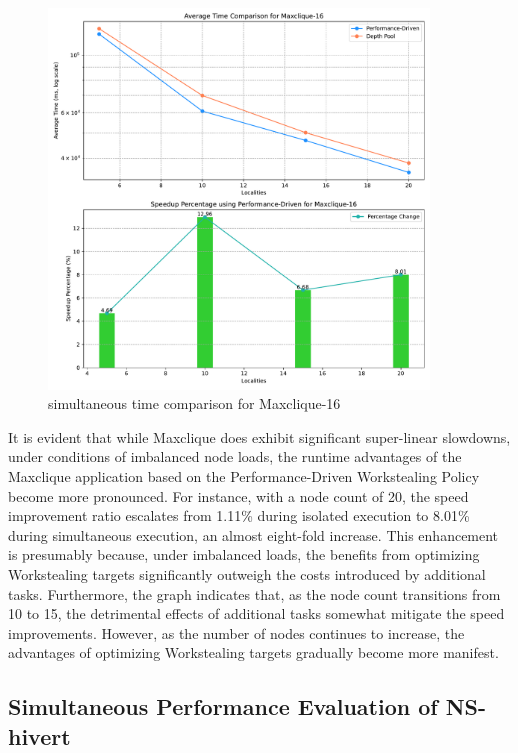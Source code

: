 \documentclass{mproj}
\begin{document}
\begin{figure}[h]
    \centering
    \includegraphics[width=0.9\textwidth]{images/time_comparison_max_simultaneously.pdf}
    \caption{simultaneous time comparison for Maxclique-16}
    \label{fig:time_comparison_max_simu}
\end{figure}
\FloatBarrier

It is evident that while Maxclique does exhibit significant super-linear slowdowns, under conditions of imbalanced node loads, the runtime advantages of the Maxclique application based on the Performance-Driven Workstealing Policy become more pronounced.
For instance, with a node count of 20, the speed improvement ratio escalates from 1.11\% during isolated execution to 8.01\% during simultaneous execution, an almost eight-fold increase.
This enhancement is presumably because, under imbalanced loads, the benefits from optimizing Workstealing targets significantly outweigh the costs introduced by additional tasks.
Furthermore, the graph indicates that, as the node count transitions from 10 to 15, the detrimental effects of additional tasks somewhat mitigate the speed improvements.
However, as the number of nodes continues to increase, the advantages of optimizing Workstealing targets gradually become more manifest.

\subsection{Simultaneous Performance Evaluation of NS-hivert}
\end{document}
